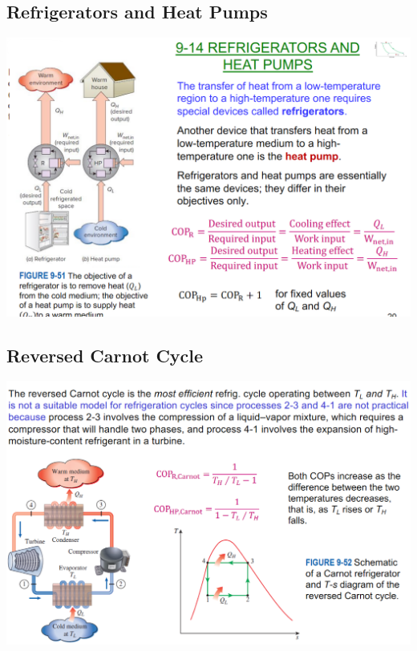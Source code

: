 \documentclass{article}
\begin{document}
\begin{multicols}{3}
    \subsection*{Refrigerators and Heat Pumps}
    \includegraphics[width=\linewidth]{Images/refrigerators_HP.png}
    \subsection*{Reversed Carnot Cycle}
    \includegraphics[width=\linewidth]{Images/reverse_carnot.png}

\end{multicols}
\end{document}
